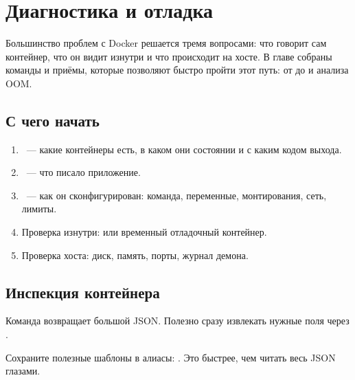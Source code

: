 \chapter{Диагностика и отладка}

Большинство проблем с Docker решается тремя вопросами: что говорит
сам контейнер, что он видит изнутри и что происходит на хосте.
В главе собраны команды и приёмы, которые позволяют быстро пройти
этот путь: от  до  и анализа OOM.

\section{С чего начать}

\begin{enumerate}
  \item {}~--- какие контейнеры есть, в каком они
        состоянии и с каким кодом выхода.
  \item {}~--- что писало приложение.
  \item {}~--- как он сконфигурирован:
        команда, переменные, монтирования, сеть, лимиты.
  \item Проверка изнутри:  или временный отладочный
        контейнер.
  \item Проверка хоста: диск, память, порты, журнал демона.
\end{enumerate}

\section{Инспекция контейнера}

Команда  возвращает большой JSON. Полезно сразу
извлекать нужные поля через .


\begin{tipbox}
Сохраните полезные шаблоны в алиасы:
.
Это быстрее, чем читать весь JSON глазами.
\end{tipbox}

